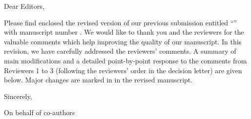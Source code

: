 Dear Editors,

Please find enclosed the revised version of our previous submission entitled \enquote{\printtitle} with manuscript number \printmanuscript.
We would like to thank you and the reviewers for the valuable comments which help improving the quality of our manuscript.
In this revision, we have carefully addressed the reviewers' comments.
A summary of main modifications and a detailed point-by-point response to the comments from Reviewers 1 to 3 (following the reviewers' order in the decision letter) are given below.
Major changes are marked in  in the revised manuscript.

\vspace{1.2em}

Sincerely,

\vspace{1.7em}

\printauthor

On behalf of co-authors
